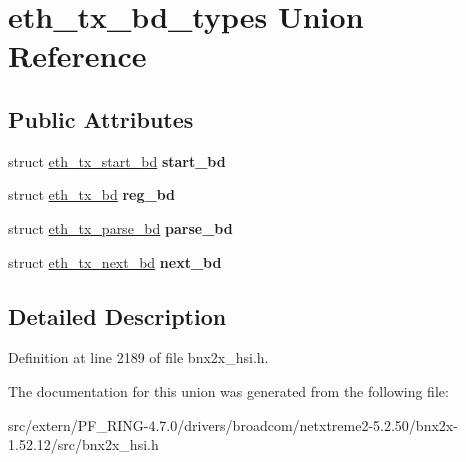 \hypertarget{unioneth__tx__bd__types}{
\section{eth\_\-tx\_\-bd\_\-types Union Reference}
\label{unioneth__tx__bd__types}
}
\subsection*{Public Attributes}
\begin{DoxyCompactItemize}
\item 
\hypertarget{unioneth__tx__bd__types_aa46c56645d75d48c2c46bffb368f3e9d}{
struct \hyperlink{structeth__tx__start__bd}{eth\_\-tx\_\-start\_\-bd} {\bfseries start\_\-bd}}
\label{unioneth__tx__bd__types_aa46c56645d75d48c2c46bffb368f3e9d}

\item 
\hypertarget{unioneth__tx__bd__types_a5e350fba5ea888cf4c5f051327a5dbe4}{
struct \hyperlink{structeth__tx__bd}{eth\_\-tx\_\-bd} {\bfseries reg\_\-bd}}
\label{unioneth__tx__bd__types_a5e350fba5ea888cf4c5f051327a5dbe4}

\item 
\hypertarget{unioneth__tx__bd__types_af083579267f288e2ec860c40bd33c8b9}{
struct \hyperlink{structeth__tx__parse__bd}{eth\_\-tx\_\-parse\_\-bd} {\bfseries parse\_\-bd}}
\label{unioneth__tx__bd__types_af083579267f288e2ec860c40bd33c8b9}

\item 
\hypertarget{unioneth__tx__bd__types_a0848e9190619082144299b7b5647a753}{
struct \hyperlink{structeth__tx__next__bd}{eth\_\-tx\_\-next\_\-bd} {\bfseries next\_\-bd}}
\label{unioneth__tx__bd__types_a0848e9190619082144299b7b5647a753}

\end{DoxyCompactItemize}


\subsection{Detailed Description}


Definition at line 2189 of file bnx2x\_\-hsi.h.



The documentation for this union was generated from the following file:\begin{DoxyCompactItemize}
\item 
src/extern/PF\_\-RING-\/4.7.0/drivers/broadcom/netxtreme2-\/5.2.50/bnx2x-\/1.52.12/src/bnx2x\_\-hsi.h\end{DoxyCompactItemize}
